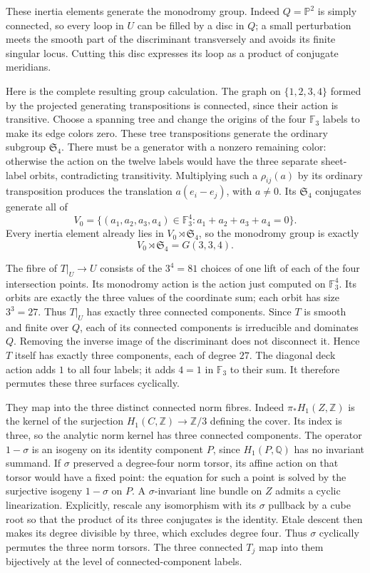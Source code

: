 These inertia elements generate the monodromy group.
Indeed $Q=\mathbb P^2$ is simply connected, so every loop
in $U$ can be filled by a disc in $Q$; a small perturbation
meets the smooth part of the discriminant transversely and
avoids its finite singular locus. Cutting this disc expresses
its loop as a product of conjugate meridians.

Here is the complete resulting group calculation. The
graph on $\{1,2,3,4\}$ formed by the projected generating
transpositions is connected, since their action is transitive.
Choose a spanning tree and change the origins of the four
$\mathbb F_3$ labels to make its edge colors zero. These
tree transpositions generate the ordinary subgroup
$\mathfrak S_4$. There must be a generator with a nonzero
remaining color: otherwise the action on the twelve labels
would have the three separate sheet-label orbits, contradicting
transitivity. Multiplying such a $\rho_{ij}(a)$ by its ordinary
transposition produces the translation
$a(e_i-e_j)$, with $a\ne0$. Its $\mathfrak S_4$ conjugates
generate all of
\[
 V_0=\{(a_1,a_2,a_3,a_4)\in\mathbb F_3^4:
                         a_1+a_2+a_3+a_4=0\}.
\]
Every inertia element already lies in
$V_0\rtimes\mathfrak S_4$, so the monodromy group is exactly
\[
                         V_0\rtimes\mathfrak S_4=G(3,3,4).
 \tag{F1T7.7}
\]

The fibre of $T|_U\to U$ consists of the $3^4=81$ choices
of one lift of each of the four intersection points. Its
monodromy action is the action just computed on
$\mathbb F_3^4$. Its orbits are exactly the three values
of the coordinate sum; each orbit has size $3^3=27$.
Thus $T|_U$ has exactly three connected components.
Since $T$ is smooth and finite over $Q$, each of its
connected components is irreducible and dominates $Q$.
Removing the inverse image of the discriminant does not
disconnect it. Hence $T$ itself has exactly three components,
each of degree $27$.
The diagonal deck action adds $1$ to all four labels; it
adds $4=1$ in $\mathbb F_3$ to their sum. It therefore
permutes these three surfaces cyclically.

They map into the three distinct connected norm fibres.
Indeed $\pi_*H_1(Z,\mathbb Z)$ is the kernel of the
surjection $H_1(C,\mathbb Z)\to\mathbb Z/3$ defining the
cover. Its index is three, so the analytic norm kernel
has three connected components. The operator $1-\sigma$
is an isogeny on its identity component $P$, since
$H_1(P,\mathbb Q)$ has no invariant summand.
If $\sigma$ preserved a degree-four norm torsor, its
affine action on that torsor would have a fixed point:
the equation for such a point is solved by the
surjective isogeny $1-\sigma$ on $P$.
A $\sigma$-invariant line bundle on $Z$ admits a cyclic
linearization. Explicitly, rescale any isomorphism with
its $\sigma$ pullback by a cube root so that the product
of its three conjugates is the identity.
Etale descent then makes its degree divisible by three,
which excludes degree four. Thus $\sigma$ cyclically
permutes the three norm torsors. The three connected
$T_j$ map into them bijectively at the level of
connected-component labels.

